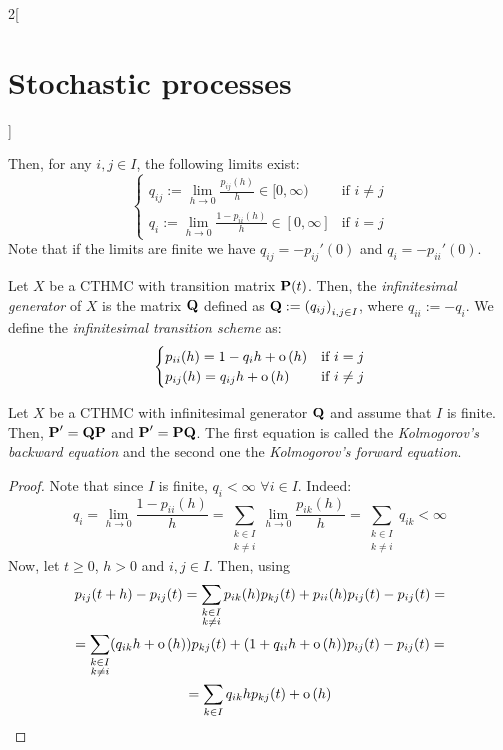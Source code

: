\documentclass[../../../main_math.tex]{subfiles}
\begin{document}
\begin{multicols}{2}[\section{Stochastic processes}]
\begin{theorem}
\begin{enumerate}
    \end{enumerate}
    Then, for any $i,j\in I$, the following limits exist:
    $$
      \begin{cases}
        q_{ij}:=\displaystyle\lim_{h\to 0} \frac{p_{ij}(h)}{h}\in[0,\infty) & \text{if } i\neq j \\
        q_i:= \displaystyle\lim_{h\to 0} \frac{1-p_{ii}(h)}{h}\in[0,\infty] & \text{if } i=j
      \end{cases}
    $$
    Note that if the limits are finite we have $q_{ij} = -{p_{ij}}'(0)$ and $q_i = -{p_{ii}}'(0)$.
  \end{theorem}
  \begin{definition}
    Let $X$ be a CTHMC with transition matrix $\boldsymbol{\mathrm{P}}(t)$. Then, the \emph{infinitesimal generator} of $X$ is the matrix $\boldsymbol{\mathrm{Q}}$ defined as $\boldsymbol{\mathrm{Q}}:={\left(q_{ij}\right)}_{i,j\in I}$, where $q_{ii}:=-q_i$. We define the \emph{infinitesimal transition scheme} as:
    $$
      \begin{cases}
        p_{ii}(h) = 1-q_ih+\mathrm{o}\left(h\right)  & \text{if } i=j     \\
        p_{ij}(h) = q_{ij}h+\mathrm{o}\left(h\right) & \text{if } i\neq j
      \end{cases}
    $$
  \end{definition}
  \begin{theorem}
    Let $X$ be a CTHMC with infinitesimal generator $\boldsymbol{\mathrm{Q}}$ and assume that $I$ is finite. Then, $\boldsymbol{\mathrm{P}}'=\boldsymbol{\mathrm{Q}}\boldsymbol{\mathrm{P}}$ and $\boldsymbol{\mathrm{P}}'=\boldsymbol{\mathrm{P}}\boldsymbol{\mathrm{Q}}$. The first equation is called the \emph{Kolmogorov's backward equation} and the second one the \emph{Kolmogorov's forward equation}.
  \end{theorem}
  \begin{proof}
    Note that since $I$ is finite, $q_i<\infty$ $\forall i\in I$. Indeed:
    $$
      q_i=\lim_{h\to 0}\frac{1-p_{ii}(h)}{h}=\sum_{\substack{k\in I\\k\ne i}}\lim_{h\to 0}\frac{p_{ik}(h)}{h}=\sum_{\substack{k\in I\\k\ne i}}q_{ik}< \infty
    $$
    Now, let $t\geq 0$, $h>0$ and $i,j\in I$. Then, using 
    \begin{multline*}
      p_{ij}(t+h)-p_{ij}(t)=\sum_{\substack{k\in I\\k\ne i}}p_{ik}(h)p_{kj}(t)+p_{ii}(h)p_{ij}(t)-p_{ij}(t)=\\=\sum_{\substack{k\in I\\k\ne i}}(q_{ik}h+\o{h})p_{kj}(t)+(1+q_{ii} h+\o{h})p_{ij}(t)-p_{ij}(t)=\\=\sum_{k\in I}q_{ik}h p_{kj}(t)+\o{h}

\end{multline*}
\end{proof}
\end{multicols}
\end{document}
